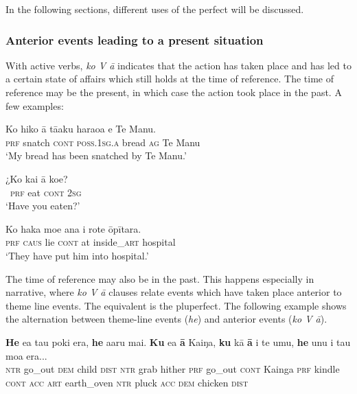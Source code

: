 In the following sections, different uses of the perfect  will be discussed. 

\subsubsection[Anterior events leading to a present situation]{Anterior events leading to a present situation}\label{sec:7.2.7.1}
With active verbs, \textit{ko V {\ꞌ}ā} indicates that the action has taken place and has led to a certain state of affairs which still holds at the time of reference. The time of reference may be the present, in which case the action took place in the past. A few examples:

\ea\label{ex:7.56}
\gll Ko hiko {\ꞌ}ā tā{\ꞌ}aku haraoa e Te Manu. \\
\textsc{prf} snatch \textsc{cont} \textsc{poss.1sg.a} bread \textsc{ag} Te Manu \\

\glt 
‘My bread has been snatched by Te Manu.’ \textstyleExampleref{[R245.039]} 
\z

\ea\label{ex:7.57}
\gll ¿Ko kai {\ꞌ}ā koe? \\
~\textsc{prf} eat \textsc{cont} \textsc{2sg} \\

\glt 
‘Have you eaten?’ \textstyleExampleref{[R245.058]} 
\z

\ea\label{ex:7.58}
\gll Ko haka moe {\ꞌ}ana {\ꞌ}i rote {\ꞌ}ōpītara. \\
\textsc{prf} \textsc{caus} lie \textsc{cont} at inside\_\textsc{art} hospital \\

\glt 
‘They have put him into hospital.’ \textstyleExampleref{[R210.122]} 
\z

The time of reference may also be in the past. This happens especially in narrative, where \textit{ko V {\ꞌ}ā} clauses relate events which have taken place anterior to theme line events. The  equivalent is the pluperfect. The following example shows the alternation between theme-line events (\textit{he}) and anterior events (\textit{ko V {\ꞌ}ā}).

\ea\label{ex:7.59}
\gll \textbf{He} e{\ꞌ}a tau poki era, \textbf{he} {\ꞌ}a{\ꞌ}aru mai. \textbf{Ku} e{\ꞌ}a \textbf{{\ꞌ}ā} Kaiŋa,  \textbf{ku} kā \textbf{{\ꞌ}ā} i te {\ꞌ}umu, \textbf{he} unu i tau moa era...\\
\textsc{ntr} go\_out \textsc{dem} child \textsc{dist} \textsc{ntr} grab hither \textsc{prf} go\_out \textsc{cont} Kainga  \textsc{prf} kindle \textsc{cont} \textsc{acc} \textsc{art} earth\_oven \textsc{ntr} pluck \textsc{acc} \textsc{dem} chicken \textsc{dist}\\

